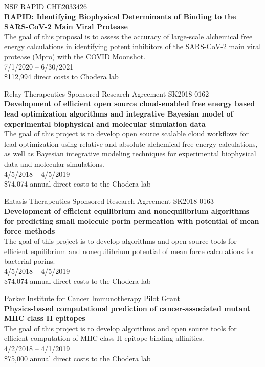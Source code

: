 \documentclass[10pt]{article}
\begin{document}
NSF RAPID CHE2033426\\
{\bf RAPID: Identifying Biophysical Determinants of Binding to the SARS-CoV-2 Main Viral Protease}\\
The goal of this proposal is to assess the accuracy of large-scale alchemical free energy calculations in identifying potent inhibitors of the SARS-CoV-2 main viral protease (Mpro) with the COVID Moonshot. \\
7/1/2020 -- 6/30/2021\\
\$112,994 direct costs to Chodera lab

\vspace{1.5ex}


Relay Therapeutics Sponsored Research Agreement SK2018-0162 \\
{\bf Development of efficient open source cloud-enabled free energy based lead optimization algorithms and integrative Bayesian model of experimental biophysical and molecular simulation data} \\
The goal of this project is to develop open source scalable cloud workflows for lead optimization using relative and absolute alchemical free energy calculations, as well as Bayesian integrative modeling techniques for experimental biophysical data and molecular simulations. \\
4/5/2018 -- 4/5/2019 \\
\$74,074 annual direct costs to the Chodera lab

\vspace{1.5ex}

Entasis Therapeutics Sponsored Research Agreement SK2018-0163 \\
{\bf Development of efficient equilibrium and nonequilibrium algorithms for predicting small molecule porin permeation with potential of mean force methods} \\
The goal of this project is to develop algorithms and open source tools for efficient equilibrium and nonequilibrium potential of mean force calculations for bacterial porins.\\
4/5/2018 -- 4/5/2019 \\
\$74,074 annual direct costs to the Chodera lab

\vspace{1.5ex}

Parker Institute for Cancer Immunotherapy Pilot Grant \\
{\bf Physics-based computational prediction of cancer-associated mutant MHC class II epitopes} \\
The goal of this project is to develop algorithms and open source tools for efficient computation of MHC class II epitope binding affinities.\\
4/2/2018 -- 4/1/2019 \\
\$75,000 annual direct costs to the Chodera lab
\end{document}
